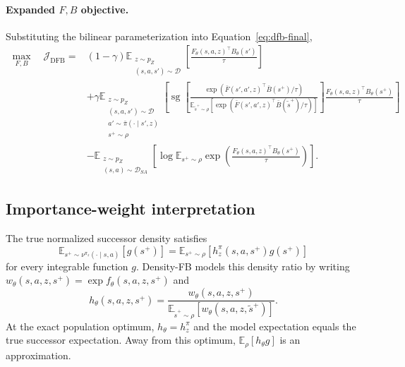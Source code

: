 \documentclass[11pt]{article}
\newcommand{\sg}{\operatorname{sg}}
\begin{document}
\paragraph{Expanded $F,B$ objective.}
Substituting the bilinear parameterization into Equation~\eqref{eq:dfb-final},
\[
\boxed{
\begin{aligned}
    \max_{F,B}\quad\mathcal J_{\mathrm{DFB}} ={}& (1-\gamma)\mathbb E_{\substack{z\sim p_Z\\(s,a,s')\sim\mathcal D}}\left[\frac{F_\theta(s,a,z)^\top B_\theta(s')}{\tau}\right] \\
    &+ \gamma\mathbb E_{\substack{z\sim p_Z\\(s,a,s')\sim\mathcal D\\a'\sim\bar\pi(\cdot\mid s',z)\\s^+\sim\rho}}
    \left[
    \sg\!\left[
    \frac{\exp\left(\bar F(s',a',z)^\top\bar B(s^+)/\tau\right)}
    {\mathbb E_{\tilde s^+\sim\rho}\left[\exp\left(\bar F(s',a',z)^\top\bar B(\tilde s^+)/\tau\right)\right]}
    \right]
    \frac{F_\theta(s,a,z)^\top B_\theta(s^+)}{\tau}
    \right] \\
    &- \mathbb E_{\substack{z\sim p_Z\\(s,a)\sim\mathcal D_{SA}}}
    \left[
    \log\mathbb E_{s^+\sim\rho}
    \exp\left(\frac{F_\theta(s,a,z)^\top B_\theta(s^+)}{\tau}\right)
    \right].
\end{aligned}
}
\]

\subsection{Importance-weight interpretation}

The true normalized successor density satisfies
\[
    \mathbb E_{s^+\sim\nu^{\pi_z}(\cdot\mid s,a)}[g(s^+)] = \mathbb E_{s^+\sim\rho}[h_z^\pi(s,a,s^+)g(s^+)]
\]
for every integrable function $g$. Density-FB models this density ratio by writing $w_\theta(s,a,z,s^+)=\exp f_\theta(s,a,z,s^+)$ and
\[
    h_\theta(s,a,z,s^+) = \frac{w_\theta(s,a,z,s^+)}{\mathbb E_{\tilde s^+\sim\rho}[w_\theta(s,a,z,\tilde s^+)]}.
\]
At the exact population optimum, $h_\theta=h_z^\pi$ and the model expectation equals the true successor expectation. Away from this optimum, $\mathbb E_\rho[h_\theta g]$ is an approximation.
\end{document}
